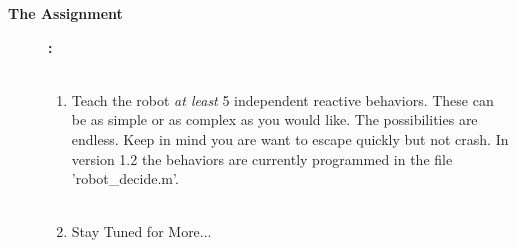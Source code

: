 \documentclass[11pt]{article}
\begin{document}
\begin{description}
\newpage

		\item [\textbf{The Assignment}]\textbf{:} \\\\
		
		\begin{enumerate}
			\item Teach the robot {\it at least} 5 independent reactive behaviors. These can be as simple or as complex as you would like. The possibilities are endless. Keep in mind you are want to escape quickly but not crash. In version 1.2 the behaviors are currently programmed in the file 'robot\_decide.m'. \\\\
		
			\item Stay Tuned for More...
		\end{enumerate}

			


    \end{description}
          
 
\newpage
\end{document}

